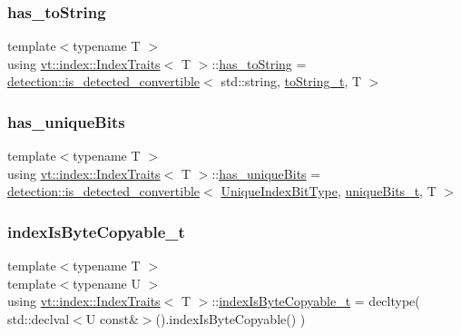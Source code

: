 \subsubsection{\texorpdfstring{has\+\_\+to\+String}{has\_toString}}
{\footnotesize\ttfamily template$<$typename T $>$ \\
using \hyperlink{structvt_1_1index_1_1_index_traits}{vt\+::index\+::\+Index\+Traits}$<$ T $>$\+::\hyperlink{structvt_1_1index_1_1_index_traits_ae91e2c26896622d9eab9416b4141042f}{has\+\_\+to\+String} =  \hyperlink{namespacedetection_afb970b23e39cfecb33449d40242c49ff}{detection\+::is\+\_\+detected\+\_\+convertible}$<$ std\+::string, \hyperlink{structvt_1_1index_1_1_index_traits_afd3d724feb07329acc70afc067320558}{to\+String\+\_\+t}, T $>$}

\mbox{\label{structvt_1_1index_1_1_index_traits_a6862d0422947a4835262b170637b462d}} 
\subsubsection{\texorpdfstring{has\+\_\+unique\+Bits}{has\_uniqueBits}}
{\footnotesize\ttfamily template$<$typename T $>$ \\
using \hyperlink{structvt_1_1index_1_1_index_traits}{vt\+::index\+::\+Index\+Traits}$<$ T $>$\+::\hyperlink{structvt_1_1index_1_1_index_traits_a6862d0422947a4835262b170637b462d}{has\+\_\+unique\+Bits} =  \hyperlink{namespacedetection_afb970b23e39cfecb33449d40242c49ff}{detection\+::is\+\_\+detected\+\_\+convertible}$<$ \hyperlink{namespacevt_a913e1f07b5228dd8bb64040dc6dcea14}{Unique\+Index\+Bit\+Type}, \hyperlink{structvt_1_1index_1_1_index_traits_ac56a2e3919488b64e42a60e1684623aa}{unique\+Bits\+\_\+t}, T $>$}

\mbox{\label{structvt_1_1index_1_1_index_traits_a67b716eec3bb224751d83b4f1e4d61fc}} 
\subsubsection{\texorpdfstring{index\+Is\+Byte\+Copyable\+\_\+t}{indexIsByteCopyable\_t}}
{\footnotesize\ttfamily template$<$typename T $>$ \\
template$<$typename U $>$ \\
using \hyperlink{structvt_1_1index_1_1_index_traits}{vt\+::index\+::\+Index\+Traits}$<$ T $>$\+::\hyperlink{structvt_1_1index_1_1_index_traits_a67b716eec3bb224751d83b4f1e4d61fc}{index\+Is\+Byte\+Copyable\+\_\+t} =  decltype( std\+::declval$<$U const\&$>$().index\+Is\+Byte\+Copyable() )}

